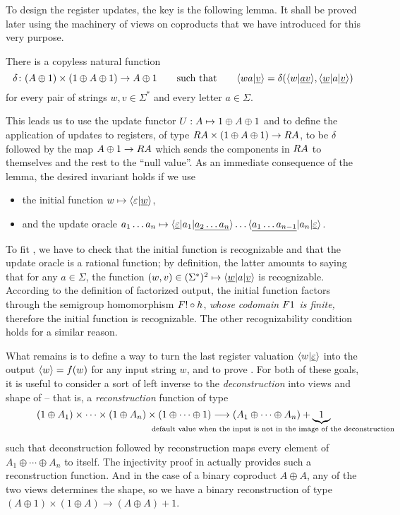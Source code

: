 To design the register updates, the key is the following lemma. It shall be proved later using the machinery of views on coproducts that we have introduced for this very purpose.
\begin{lemma}\label{lem:compute-next-configuration}
  There is a {copyless} natural function
  \[
    \delta\colon (A \oplus 1) \times (1 \oplus A \oplus 1) \to A \oplus 1
    \qquad\text{such that}\qquad
    \langle wa|\underline v \rangle = \delta(\langle w|\underline {av} \rangle,\langle \underline w | a|\underline v \rangle)
  \]
  for every pair of strings $w,v \in \Sigma^*$ and every letter $a \in \Sigma$.
\end{lemma}
This leads us to use the update functor $\functoru : A \mapsto 1 \oplus A \oplus 1$ and to define the application of updates to registers, of type $\functorr A \times (1 \oplus A \oplus 1) \to \functorr A$, to be $\delta$ followed by the map $A \oplus 1 \to \functorr A$ which sends the components in $\functorr A$ to themselves and the rest to the \enquote{null value}.
As an immediate consequence of the lemma, the desired invariant holds if we use
\begin{itemize}
  \item the initial function $w \mapsto \langle \varepsilon|\underline{w} \rangle$,
  \item and the update oracle $a_1 \dots a_n \mapsto \langle \underline\varepsilon|a_1|\underline{a_2 \dots a_n} \rangle \dots
  \langle \underline{a_1 \dots a_{n-1}}|a_n|\underline\varepsilon \rangle$.
\end{itemize}
To fit , we have to check that the initial function is recognizable and that the update oracle is a rational function; by definition, the latter amounts to saying that for any $a\in\Sigma$, the function $(w,v) \in (\Sigma^*)^2 \mapsto \langle \underline{w}|a|\underline{v} \rangle$ is recognizable. According to the definition of factorized output, the initial function factors through the semigroup homomorphism $\functor! \circ h$, \emph{whose codomain $\functor1$ is finite,} therefore the initial function is recognizable. The other recognizability condition holds for a similar reason.

What remains is to define a way to turn the last register valuation
$\langle w|\underline\varepsilon \rangle$ into the output $\langle w \rangle = f(w)$ for any input string
$w$, and to prove . For both of these
goals, it is useful to consider a sort of left inverse to the \emph{deconstruction} into views and shape of  -- that is, a \emph{reconstruction} function of type
\[ (1 \oplus A_1) \times \cdots \times (1 \oplus A_n) \times (1 \oplus \cdots
  \oplus 1) \longrightarrow (A_1 \oplus \cdots \oplus A_n) + \myunderbrace{1}{default value when the input is not in the image of the deconstruction\qquad\qquad\qquad\qquad\qquad\qquad} \]
such that deconstruction followed by reconstruction maps every element of $A_1 \oplus \cdots \oplus A_n$ to itself. The injectivity proof in  actually provides such a reconstruction function.
And in the case of a binary coproduct $A \oplus A$, any of the two views determines the shape, so we have a binary reconstruction of type $(A\oplus1)\times(1\oplus A) \to (A\oplus A)+1$.

